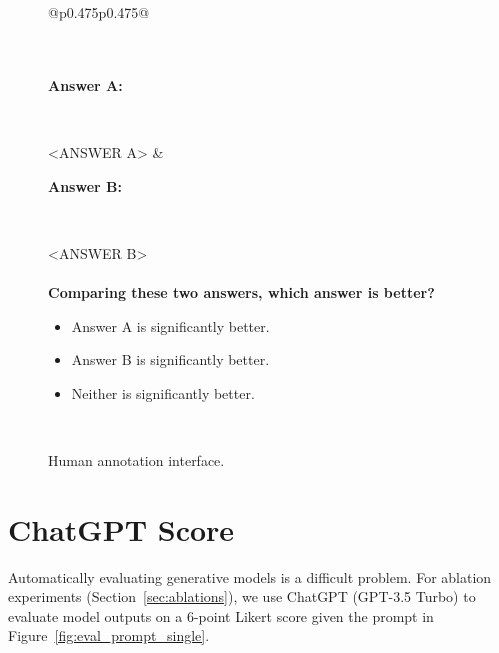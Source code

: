 \documentclass{article}
\begin{document}
 \begin{figure}[p]
    \scriptsize
    \centering
    \begin{tabular}{@{}p{}p{}@{}}
    \toprule

    \\
    
    \\
    
    \textbf{Answer A:}
    
    ~
    
    <ANSWER A>
    & 

    \textbf{Answer B:}
    
    ~
    
    <ANSWER B>\\
    \\
    \textbf{Comparing these two answers, which answer is better?}
    \begin{itemize}[leftmargin=18pt]
       \item[$\mdblksquare$] Answer A is significantly better.
       \item[$\mdblksquare$] Answer B is significantly better.
       \item[$\mdblksquare$] Neither is significantly better.
    \end{itemize}\\
    \bottomrule
    \end{tabular}
    \caption{Human annotation interface.}
    \label{fig:human_annot}
\end{figure}

\section{ChatGPT Score}
\label{sec:gpt_annotation}

Automatically evaluating generative models is a difficult problem.
For ablation experiments (Section~\ref{sec:ablations}), we use ChatGPT (GPT-3.5 Turbo) to evaluate model outputs on a 6-point Likert score given the prompt in Figure~\ref{fig:eval_prompt_single}.
\end{document}
